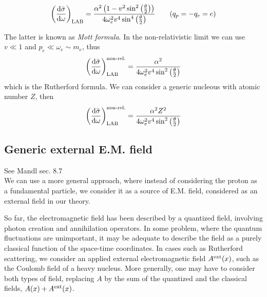 \documentclass[TheoreticalPhy_ModB.tex]{subfiles}
\begin{document}
\[\left(\frac{\textup{d}\bar\sigma}{\textup{d}\omega}\right)_{\textup{LAB}}=\frac{\alpha^2\left(1-v^2\sin^2\left(\frac\theta2\right)\right)}{4\omega_e^2v^4\sin^4\left(\frac\theta2\right)}\qquad (q_p=-q_e=e)\]

The latter is known as \emph{Mott formula}. In the non-relativistic limit we can use $v\ll1$ and $p_e\ll\omega_e\sim m_e$, thus
\[\left(\frac{\textup{d}\bar\sigma}{\textup{d}\omega}\right)_{\textup{LAB}}^{\textup{non-rel.}}=\frac{\alpha^2}{4\omega_e^2v^4\sin^2\left(\frac\theta2\right)}\]
which is the Rutherford formula. We can consider a generic nucleous with atomic number $Z$, then
\[\left(\frac{\textup{d}\bar\sigma}{\textup{d}\omega}\right)_{\textup{LAB}}^{\textup{non-rel.}}=\frac{\alpha^2Z^2}{4\omega_e^2v^4\sin^2\left(\frac\theta2\right)}\]

\subsection{Generic external E.M. field}
\textsf{See Mandl sec. 8.7}\\
We can use a more general approach, where instead of considering the proton as a fundamental particle, we consider it as a source of E.M. field, considered as an external field in our theory. 

So far, the electromagnetic field has been described by a quantized field, involving photon creation and annihilation operators. In some problem, where the quantum fluctuations are unimportant, it may be adequate to describe the field as a purely classical function of the space-time coordinates. In cases such as Rutherford scattering, we consider an applied external electromagnetic field $A^\textup{ext}(x)$, such as the Coulomb field of a heavy nucleus. More generally, one may have to consider both types of field, replacing $A$ by the sum of the quantized and the classical fields, $A(x)+A^{\textup{ext}}(x)$.
\end{document}

